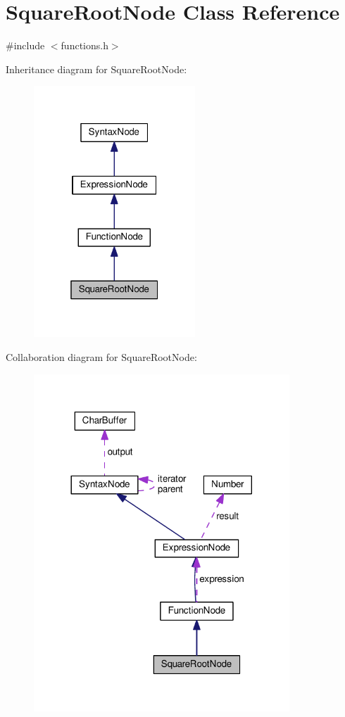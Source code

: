 \hypertarget{classSquareRootNode}{}\section{Square\+Root\+Node Class Reference}
\label{classSquareRootNode}


{\ttfamily \#include $<$functions.\+h$>$}



Inheritance diagram for Square\+Root\+Node\+:
\nopagebreak
\begin{figure}[H]
\begin{center}
\leavevmode
\includegraphics[width=172pt]{d4/d41/classSquareRootNode__inherit__graph}
\end{center}
\end{figure}


Collaboration diagram for Square\+Root\+Node\+:
\nopagebreak
\begin{figure}[H]
\begin{center}
\leavevmode
\includegraphics[width=272pt]{d7/da1/classSquareRootNode__coll__graph}
\end{center}
\end{figure}

